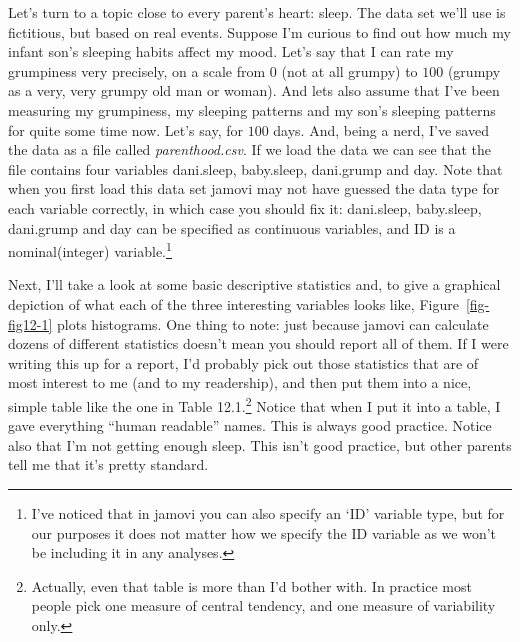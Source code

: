 \documentclass[
  a4paper,
]{book}
\begin{document}
Let's turn to a topic close to every parent's heart: sleep. The data set
we'll use is fictitious, but based on real events. Suppose I'm curious
to find out how much my infant son's sleeping habits affect my mood.
Let's say that I can rate my grumpiness very precisely, on a scale from
0 (not at all grumpy) to \(100\) (grumpy as a very, very grumpy old man
or woman). And lets also assume that I've been measuring my grumpiness,
my sleeping patterns and my son's sleeping patterns for quite some time
now. Let's say, for \(100\) days. And, being a nerd, I've saved the data
as a file called \emph{parenthood.csv}. If we load the data we can see
that the file contains four variables dani.sleep, baby.sleep, dani.grump
and day. Note that when you first load this data set jamovi may not have
guessed the data type for each variable correctly, in which case you
should fix it: dani.sleep, baby.sleep, dani.grump and day can be
specified as continuous variables, and ID is a nominal(integer)
variable.\footnote{I've noticed that in jamovi you can also specify an
  `ID' variable type, but for our purposes it does not matter how we
  specify the ID variable as we won't be including it in any analyses.}

Next, I'll take a look at some basic descriptive statistics and, to give
a graphical depiction of what each of the three interesting variables
looks like, Figure~\ref{fig-fig12-1} plots histograms. One thing to
note: just because jamovi can calculate dozens of different statistics
doesn't mean you should report all of them. If I were writing this up
for a report, I'd probably pick out those statistics that are of most
interest to me (and to my readership), and then put them into a nice,
simple table like the one in Table 12.1.\footnote{Actually, even that
  table is more than I'd bother with. In practice most people pick one
  measure of central tendency, and one measure of variability only.}
Notice that when I put it into a table, I gave everything ``human
readable'' names. This is always good practice. Notice also that I'm not
getting enough sleep. This isn't good practice, but other parents tell
me that it's pretty standard.
\end{document}
